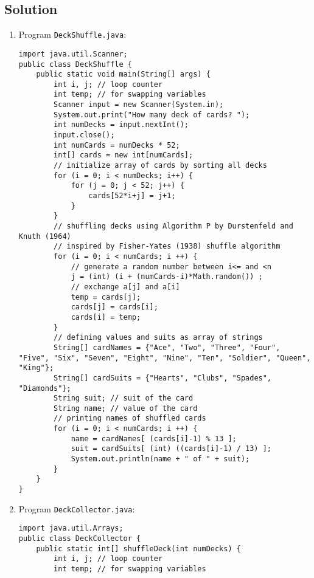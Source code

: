 \subsection*{Solution}
\begin{enumerate}
\item Program \texttt{DeckShuffle.java}:
\lstset{language=java}
\begin{lstlisting}
import java.util.Scanner;
public class DeckShuffle {
	public static void main(String[] args) {
		int i, j; // loop counter
		int temp; // for swapping variables
		Scanner input = new Scanner(System.in);
		System.out.print("How many deck of cards? ");
		int numDecks = input.nextInt();
		input.close();
		int numCards = numDecks * 52;
		int[] cards = new int[numCards];
		// initialize array of cards by sorting all decks
		for (i = 0; i < numDecks; i++) {
			for (j = 0; j < 52; j++) {
				cards[52*i+j] = j+1;
			}
		}
		// shuffling decks using Algorithm P by Durstenfeld and Knuth (1964)
		// inspired by Fisher-Yates (1938) shuffle algorithm
		for (i = 0; i < numCards; i ++) {
			// generate a random number between i<= and <n
			j = (int) (i + (numCards-i)*Math.random()) ;
			// exchange a[j] and a[i]
			temp = cards[j];
			cards[j] = cards[i];
			cards[i] = temp;
		}
		// defining values and suits as array of strings
		String[] cardNames = {"Ace", "Two", "Three", "Four", "Five", "Six", "Seven", "Eight", "Nine", "Ten", "Soldier", "Queen", "King"};
		String[] cardSuits = {"Hearts", "Clubs", "Spades", "Diamonds"};
		String suit; // suit of the card
		String name; // value of the card
		// printing names of shuffled cards
		for (i = 0; i < numCards; i ++) {
			name = cardNames[ (cards[i]-1) % 13 ];
			suit = cardSuits[ (int) ((cards[i]-1) / 13) ];
			System.out.println(name + " of " + suit);
		}
	}
}
\end{lstlisting}
\item Program \texttt{DeckCollector.java}:
\lstset{language=java}
\begin{lstlisting}
import java.util.Arrays;
public class DeckCollector {
	public static int[] shuffleDeck(int numDecks) {
		int i, j; // loop counter
		int temp; // for swapping variables


\end{lstlisting}
\end{enumerate}
